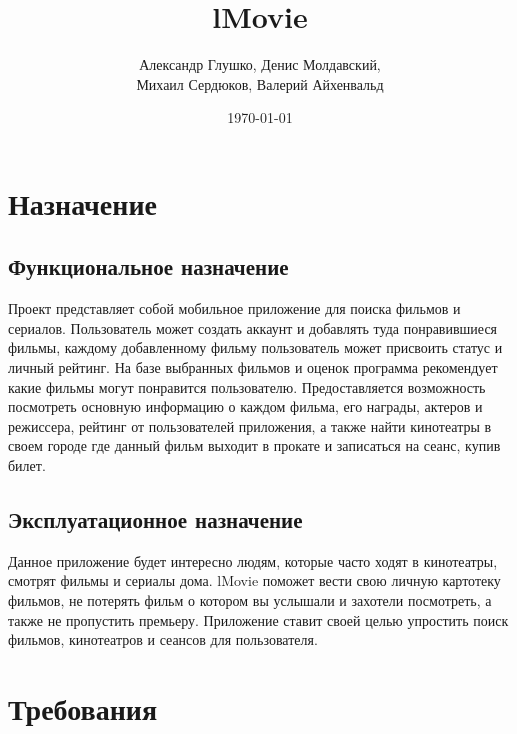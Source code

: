 \documentclass[a4paper,16pt]{article}
\title{lMovie}
\author{Александр Глушко, Денис Молдавский, \\ Михаил Сердюков, Валерий Айхенвальд}
\date{\today}
\begin{document}
\maketitle
\tableofcontents
\newpage

\section{Назначение}
\subsection{Функциональное назначение}
Проект представляет собой мобильное приложение для поиска фильмов и сериалов. Пользователь может создать аккаунт и добавлять туда понравившиеся фильмы, каждому добавленному фильму пользователь может присвоить статус и личный рейтинг. На базе выбранных фильмов и оценок программа рекомендует какие фильмы могут понравится пользователю. Предоставляется  возможность посмотреть основную информацию о каждом фильма, его награды, актеров и режиссера, рейтинг от пользователей приложения, а также найти кинотеатры в своем городе где данный фильм выходит в прокате и записаться на сеанс, купив билет.
\subsection{Эксплуатационное назначение}
Данное приложение будет интересно людям, которые часто ходят в кинотеатры, смотрят фильмы и сериалы дома. lMovie поможет вести свою личную картотеку фильмов, не потерять фильм о котором вы услышали и захотели посмотреть, а также не пропустить премьеру. Приложение ставит своей целью упростить поиск фильмов, кинотеатров и сеансов для пользователя. 


\section{Требования}
\end{document}
